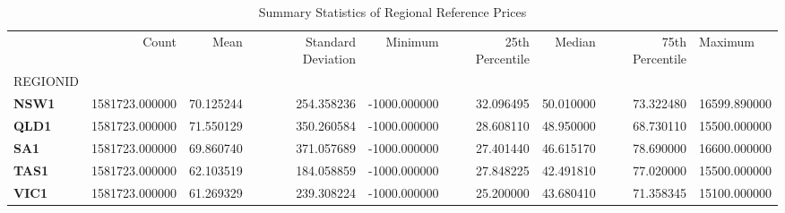 \begin{table}
\caption{Summary Statistics of Regional Reference Prices}
\label{tab:summary_stats}
\begin{tabular}{lrrrrrrr}
\toprule
 & Count & Mean & Standard Deviation & Minimum & 25th Percentile & Median & 75th Percentile & Maximum \\
REGIONID &  &  &  &  &  &  &  &  \\
\midrule
\textbf{NSW1} & 1581723.000000 & 70.125244 & 254.358236 & -1000.000000 & 32.096495 & 50.010000 & 73.322480 & 16599.890000 \\
\textbf{QLD1} & 1581723.000000 & 71.550129 & 350.260584 & -1000.000000 & 28.608110 & 48.950000 & 68.730110 & 15500.000000 \\
\textbf{SA1} & 1581723.000000 & 69.860740 & 371.057689 & -1000.000000 & 27.401440 & 46.615170 & 78.690000 & 16600.000000 \\
\textbf{TAS1} & 1581723.000000 & 62.103519 & 184.058859 & -1000.000000 & 27.848225 & 42.491810 & 77.020000 & 15500.000000 \\
\textbf{VIC1} & 1581723.000000 & 61.269329 & 239.308224 & -1000.000000 & 25.200000 & 43.680410 & 71.358345 & 15100.000000 \\
\bottomrule
\end{tabular}
\end{table}
